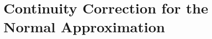 \documentclass{article}
\begin{document}
\pagebreak
\section*{Continuity Correction for the Normal Approximation}

\end{document}
